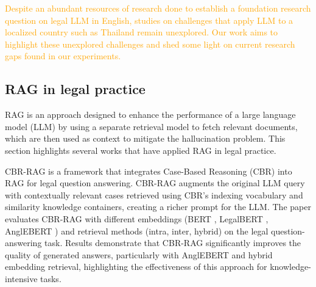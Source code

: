 \textcolor{orange}{Despite an abundant resources of research done to establish a foundation research question on legal LLM in English, studies on challenges that apply LLM to a localized country such as Thailand remain unexplored. Our work aims to highlight these unexplored challenges and shed some light on current research gaps found in our experiments.}


\subsection{RAG in legal practice}

{
RAG \cite{originalRAG} is an approach designed to enhance the performance of a large language model (LLM) by using a separate retrieval model to fetch relevant documents, which are then used as context to mitigate the hallucination problem. This section highlights several works that have applied RAG in legal practice.
}

\label{sec:raginlegal}
CBR-RAG \cite{CBR-RAG} is a framework that integrates Case-Based Reasoning (CBR) into RAG for legal question answering. CBR-RAG augments the original LLM query with contextually relevant cases retrieved using CBR’s indexing vocabulary and similarity knowledge containers, creating a richer prompt for the LLM. The paper evaluates CBR-RAG with different embeddings (BERT \cite{bert}, LegalBERT \cite{legalbert}, AnglEBERT \cite{anglebert}) and retrieval methods (intra, inter, hybrid) on the legal question-answering task. Results demonstrate that CBR-RAG significantly improves the quality of generated answers, particularly with AnglEBERT and hybrid embedding retrieval, highlighting the effectiveness of this approach for knowledge-intensive tasks.

